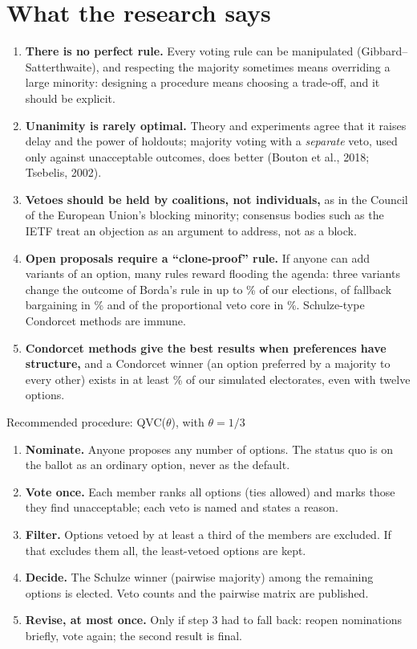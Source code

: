 \documentclass[10pt,a4paper]{article}
\begin{document}
\section{What the research says}
\begin{enumerate}[label=\textbf{\arabic*.}]
  \item \textbf{There is no perfect rule.} Every voting rule can be manipulated (Gibbard--Satterthwaite),
  and respecting the majority sometimes means overriding a large minority: designing a procedure means
  choosing a trade-off, and it should be explicit.
  \item \textbf{Unanimity is rarely optimal.} Theory and experiments agree that it raises delay and the
  power of holdouts; majority voting with a \emph{separate} veto, used only against unacceptable outcomes,
  does better (Bouton et al., 2018; Tsebelis, 2002).
  \item \textbf{Vetoes should be held by coalitions, not individuals,} as in the Council of the European
  Union's blocking minority; consensus bodies such as the IETF treat an objection as an argument to
  address, not as a block.
  \item \textbf{Open proposals require a ``clone-proof'' rule.} If anyone can add variants of an option,
  many rules reward flooding the agenda: three variants change the outcome of Borda's rule in up to
  \KNclonesBorda\% of our elections, of fallback bargaining in \KNclonesFallback\% and of the
  proportional veto core in \KNclonesPVC\%. Schulze-type Condorcet methods are immune.
  \item \textbf{Condorcet methods give the best results when preferences have structure,} and a
  Condorcet winner (an option preferred by a majority to every other) exists in at least
  \KNcwPolarisedTwelve\% of our simulated electorates, even with twelve options.
\end{enumerate}

\begin{keybox}{Recommended procedure: QVC($\theta$), with $\theta = 1/3$}
\begin{enumerate}[label=\textbf{\arabic*.},leftmargin=*]
  \item \textbf{Nominate.} Anyone proposes any number of options. The status quo is on the ballot as an
  ordinary option, never as the default.
  \item \textbf{Vote once.} Each member ranks all options (ties allowed) and marks those they find
  unacceptable; each veto is named and states a reason.
  \item \textbf{Filter.} Options vetoed by at least a third of the members are excluded. If that excludes
  them all, the least-vetoed options are kept.
  \item \textbf{Decide.} The Schulze winner (pairwise majority) among the remaining options is elected.
  Veto counts and the pairwise matrix are published.
  \item \textbf{Revise, at most once.} Only if step 3 had to fall back: reopen nominations briefly, vote
  again; the second result is final.
\end{enumerate}
\end{keybox}
\end{document}
